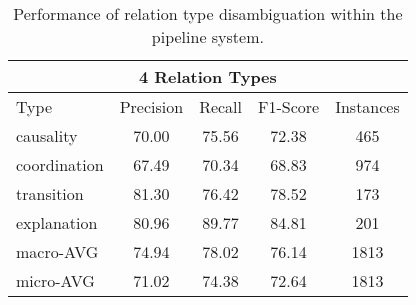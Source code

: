 \begin{table}[!htbp]
\centering
\begin{tabular}{|l|c|c|c|c|}
\hline

\multicolumn{5}{|c|}{4 Relation Types}                                          \\ \hline
Type                &     Precision &     Recall &     F1-Score &     Instances \\ \hline
causality           &     70.00     &     75.56  &     72.38    &     465       \\ \hline
coordination        &     67.49     &     70.34  &     68.83    &     974       \\ \hline
transition          &     81.30     &     76.42  &     78.52    &     173       \\ \hline
explanation         &     80.96     &     89.77  &     84.81    &     201       \\ \hline
macro-AVG           &     74.94     &     78.02  &     76.14    &     1813      \\ \hline
micro-AVG           &     71.02     &     74.38  &     72.64    &     1813      \\ \hline

\end{tabular}
\caption{\label{t:sense-types-pipeline} Performance of relation type
disambiguation within the pipeline system. }
\end{table}
